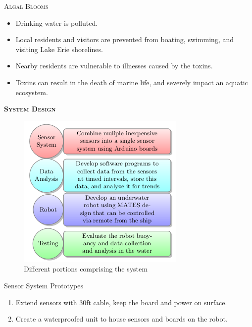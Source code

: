 \documentclass[final,t]{beamer}
\begin{document}
\begin{frame}{}
\begin{columns}
\begin{column}{.5\linewidth}
\begin{block}{\textsc{Algal Blooms}}
                \begin{itemize}
               		\item Drinking water is polluted.
					\item Local residents and visitors are prevented from boating, swimming, and visiting Lake Erie shorelines.
					\item Nearby residents are vulnerable to illnesses caused by the toxins.
					\item Toxins can result in the death of marine life, and severely impact an aquatic ecosystem.
				\end{itemize}
                    \vspace*{3mm}
                \end{block}
                \begin{exampleblock}{\textsc{\textbf{System Design}}}
					   \begin{figure}
                    		\includegraphics[scale = 4]{assets/diagram}
                    	\caption{Different portions comprising the system}
                    	\end{figure}

  					\begin{block}{Sensor System Prototypes}
                    \begin{enumerate}
    	                \item
                    	Extend sensors with 30ft cable, keep the board and power on surface.
						\item  Create a waterproofed unit to house sensors and boards on the robot.
					\end{enumerate}


\end{block}
\end{exampleblock}
\end{column}
\end{columns}
\end{frame}
\end{document}
